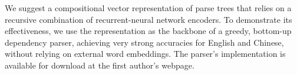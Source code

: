 We suggest a compositional vector representation of parse trees that relies on a recursive combination of recurrent-neural network encoders. To demonstrate its effectiveness, we use the representation as the backbone of a greedy, bottom-up dependency parser, achieving very strong accuracies for English and Chinese, without relying on external word embeddings. The parser's implementation is available for download at the first author's webpage.
